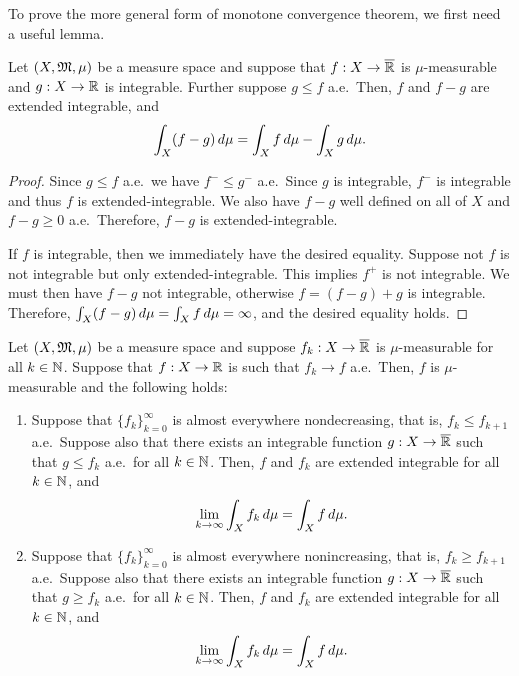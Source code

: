 \documentclass[a4paper]{article}
\renewcommand{\seqinfk}[1]{\{ #1 \}_{k=0}^\infty}
\begin{document}
To prove the more general form of monotone convergence theorem, we first
need a useful lemma.

\begin{lemma}
  Let $(X, \mathfrak{M}, \mu)$ be a measure space and suppose that $f : X \to
    \overline{\mathbb{R}}$ is $\mu$-measurable and $g : X \to \mathbb{R}$ is integrable. Further
  suppose $g \leq f$ a.e.\ Then, $f$ and $f - g$ are extended integrable,
  and
  \[
    \int_X (f - g) \, d \mu = \int_X f \, d \mu - \int_X g \, d \mu.
  \]
\end{lemma}

\begin{proof}
  Since $g \leq f$ a.e.\, we have $f^- \leq g^-$ a.e.\ Since $g$ is
  integrable, $f^-$ is integrable and thus $f$ is extended-integrable. We
  also have $f - g$ well defined on all of $X$ and $f - g \geq 0$ a.e.\
  Therefore, $f - g$ is extended-integrable.

  If $f$ is integrable, then we immediately have the desired equality.
  Suppose not $f$ is not integrable but only extended-integrable. This
  implies $f^+$ is not integrable. We must then have $f - g$ not
  integrable, otherwise $f = (f - g) + g$ is integrable. Therefore,
  $\int_X (f - g) \, d \mu = \int_X f \, d \mu = \infty$, and the desired
  equality holds.
\end{proof}

\begin{thm}
  Let $(X, \mathfrak{M}, \mu)$ be a measure space and suppose
  $f_k : X \to \overline{\mathbb{R}}$ is $\mu$-measurable for
  all $k \in \mathbb{N}$. Suppose that
  $f: X \to \mathbb{R}$ is such that $f_k \to f$ a.e.\ Then,
  $f$ is $\mu$-measurable and the following holds:
  \begin{enumerate}
    \item Suppose that $\seqinfk{f_k}$ is almost everywhere nondecreasing,
          that is, $f_k \leq f_{k+1}$ a.e.\ Suppose also that there exists
          an integrable function $g : X \to \overline{\mathbb{R}}$ such that $g \leq
          f_k$ a.e.\ for all $k \in \mathbb{N}$. Then, $f$ and $f_k$ are extended
          integrable for all $k \in \mathbb{N}$, and
          \[
            \lim_{k \to \infty} \int_X f_k \, d \mu = \int_X f \, d \mu.
          \]

    \item Suppose that $\seqinfk{f_k}$ is almost everywhere nonincreasing,
          that is, $f_k \geq f_{k+1}$ a.e.\ Suppose also that there exists
          an integrable function $g : X \to \overline{\mathbb{R}}$ such that $g \geq
          f_k$ a.e.\ for all $k \in \mathbb{N}$. Then, $f$ and $f_k$ are extended
          integrable for all $k \in \mathbb{N}$, and
          \[
            \lim_{k \to \infty} \int_X f_k \, d \mu = \int_X f \, d \mu.
          \]
  \end{enumerate}
\end{thm}
\end{document}
